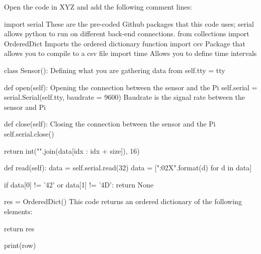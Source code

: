 \documentclass{article}
\begin{document}
Open the code in XYZ and add the following comment lines: 

import serial  These are the pre-coded Github packages that this code uses; serial allows python to run on different back-end connections.
from collections import OrderedDict  Imports the ordered dictionary function
import csv  Package that allows you to compile to a csv file
import time  Allows you to define time intervals

class Sensor(): Defining what you are gathering data from
    self.tty = tty
  
  def open(self):  Opening the connection between the sensor and the Pi
    self.serial = serial.Serial(self.tty, baudrate = 9600)  Baudrate is the signal rate between the sensor and Pi
  
  def close(self):  Closing the connection between the sensor and the Pi
    self.serial.close()
    
    return int("".join(data[idx : idx + size]), 16)
    
  def read(self): %
    data = self.serial.read(32)
    data = ["{:02X}".format(d) for d in data]
    
    if data[0] != '42' or data[1] != '4D':
      return None
      
    res = OrderedDict()  This code returns an ordered dictionary of the following elements:

    return res
    
                                print(row)
               
\end{document}
